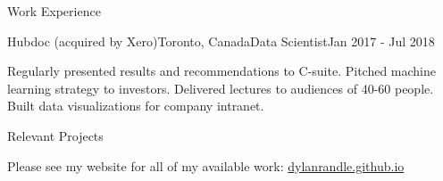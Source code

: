 \documentclass{resume} %
\begin{document}
\begin{rSection}{Work Experience}
\begin{rSubsection}{Hubdoc (acquired by Xero)}{Toronto, Canada}{Data Scientist}{Jan 2017 - Jul 2018}
\item
    Regularly presented results and recommendations to C-suite.
    Pitched machine learning strategy to investors.
    Delivered lectures to audiences of 40-60 people.
    Built data visualizations for company intranet.
\end{rSubsection}


\end{rSection}


\begin{rSection}{Relevant Projects}

Please see my website for all of my available work: \url{dylanrandle.github.io}




\end{rSection}




\end{document}
